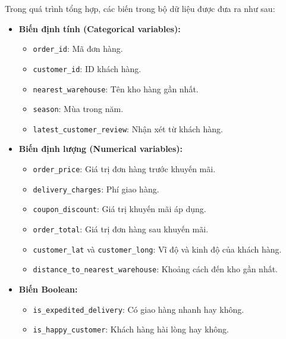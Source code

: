 Trong quá trình tổng hợp, các biến trong bộ dữ liệu được đưa ra như sau:
\begin{itemize}
    \item \textbf{Biến định tính (Categorical variables):}
    \begin{itemize}
        \item \texttt{order\_id}: Mã đơn hàng.
        \item \texttt{customer\_id}: ID khách hàng.
        \item \texttt{nearest\_warehouse}: Tên kho hàng gần nhất.
        \item \texttt{season}: Mùa trong năm.
        \item \texttt{latest\_customer\_review}: Nhận xét từ khách hàng.
        
    \end{itemize}
    \item \textbf{Biến định lượng (Numerical variables):}
    \begin{itemize}
        \item \texttt{order\_price}: Giá trị đơn hàng trước khuyến mãi.
        \item \texttt{delivery\_charges}: Phí giao hàng.
        \item \texttt{coupon\_discount}: Giá trị khuyến mãi áp dụng.
        \item \texttt{order\_total}: Giá trị đơn hàng sau khuyến mãi.
        \item \texttt{customer\_lat} và \texttt{customer\_long}: Vĩ độ và kinh độ của khách hàng.
        \item \texttt{distance\_to\_nearest\_warehouse}: Khoảng cách đến kho gần nhất.
    \end{itemize}
    \item \textbf{Biến Boolean:}
    \begin{itemize}
        \item \texttt{is\_expedited\_delivery}: Có giao hàng nhanh hay không.
        \item \texttt{is\_happy\_customer}: Khách hàng hài lòng hay không.
    \end{itemize}
\end{itemize}
\raggedbottom